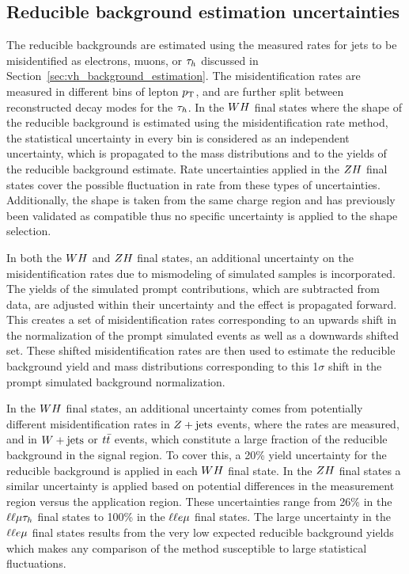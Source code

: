\subsection{Reducible background estimation uncertainties}
The reducible backgrounds are estimated using the measured rates for jets to be 
misidentified as electrons, muons, or $\tau_{h}$ discussed in 
Section~\ref{sec:vh_background_estimation}. The misidentification rates are 
measured in different bins of lepton $p_\mathrm{T}$, and are further split between 
reconstructed decay modes for the $\tau_{h}$. In the $WH$ final states where
the shape of the reducible background is estimated using the misidentification rate
method, the statistical uncertainty in every 
bin is considered as an independent uncertainty, which is propagated to the mass 
distributions and to the yields of the reducible background estimate. Rate
uncertainties applied in the $ZH$ final states cover the possible fluctuation
in rate from these types of uncertainties. Additionally, the shape is taken from the same charge
region and has previously been validated as compatible thus no specific
uncertainty is applied to the shape selection.

In both the $WH$ and $ZH$ final states, an additional
uncertainty on the misidentification rates due to mismodeling of simulated
samples is incorporated. The yields of the simulated prompt contributions, which are subtracted from
data, are adjusted within their uncertainty and the effect is propagated forward. This
creates a set of misidentification rates corresponding to an upwards shift in the
normalization of the prompt simulated events as well as a downwards shifted set. These
shifted misidentification rates are then used to estimate the reducible background yield and 
mass distributions corresponding to this 1$\sigma$ shift in the prompt simulated 
background normalization.

In the $WH$ final states, an 
additional uncertainty comes from potentially different misidentification rates 
in $Z+\textrm{jets}$ events, where the rates are measured, and in $W+\textrm{jets}$ or 
$t\bar{t}$ events, which constitute a large fraction of the reducible background 
in the signal region. To cover this, a 20\% yield uncertainty for the reducible 
background is applied in each $WH$ final state. In the $ZH$ final
states a similar uncertainty is applied based on potential differences in the
measurement region versus the application region. These uncertainties
range from 26\% in the $\ell\ell\mu\tau_{h}$ final states to 100\% in the
$\ell\ell e\mu$ final states. The large uncertainty in the $\ell\ell e\mu$ 
final states results from the very low expected reducible background yields 
which makes any comparison of the method susceptible to large statistical fluctuations.


